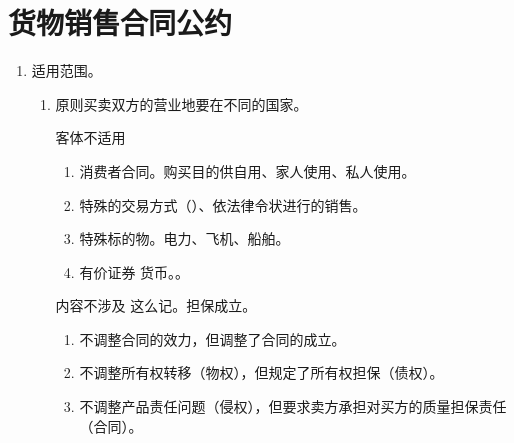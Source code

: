 \section{货物销售合同公约}
\begin{enumerate}
  \item 适用范围。
        \begin{enumerate}
          \item 原则买卖双方的营业地要在不同的国家。
                \begin{kk}{客体不适用}
                  \begin{enumerate}
                    \item 消费者合同。购买目的供自用、家人使用、私人使用。
                    \item 特殊的交易方式（）、依法律令状进行的销售。
                    \item 特殊标的物。电力、飞机、船舶。
                    \item 有价证券 \hz 货币。。
                  \end{enumerate}
                \end{kk}

                \begin{kk}{内容不涉及}
                  这么记。担保成立。
                  \begin{enumerate}
                    \item 不调整合同的效力，但调整了合同的成立。
                    \item 不调整所有权转移（物权），但规定了所有权担保（债权）。
                    \item 不调整产品责任问题（侵权），但要求卖方承担对买方的质量担保责任（合同）。
                  \end{enumerate}
                \end{kk}


\end{enumerate}
\end{enumerate}
